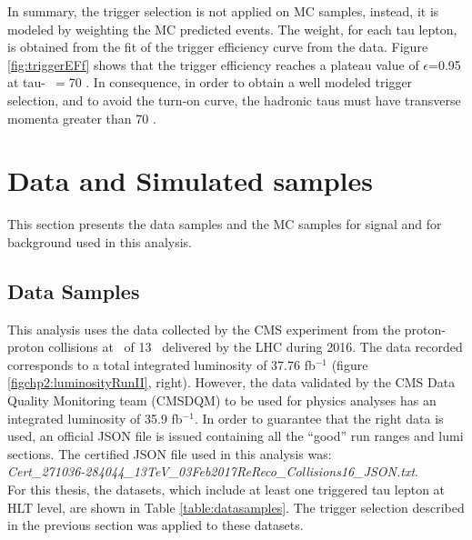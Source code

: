\noindent In summary, the trigger selection is not applied on MC samples, instead, it
is modeled by weighting the MC predicted events. The weight, for each tau lepton, is 
obtained from the fit of the trigger efficiency curve from the 
data. Figure \ref{fig:triggerEFf} shows that the trigger efficiency reaches 
a plateau value of $\epsilon$=0.95 at tau-\pt~$=$70 \GeV. In consequence, in order to obtain
a well modeled trigger selection, and to avoid the turn-on curve, the hadronic taus must have 
transverse momenta greater than 70 \GeV.

\section{Data and Simulated samples}
\label{sec:Samples}

This section presents the data samples and  the MC samples
for signal and for background used in this analysis.

\subsection{Data Samples}
\label{subsec:Data}

This analysis uses the data collected by the CMS experiment
from the proton-proton collisions at 
\centermassenergy~of 13 \TeV~delivered by the LHC during 2016. The data 
recorded corresponds to a total integrated 
luminosity of 37.76 fb$^{-1}$ (figure \ref{figchp2:luminosityRunII}, right). However, 
the data validated by the CMS Data Quality Monitoring team (CMSDQM) to be used 
for physics analyses has an integrated luminosity of 35.9 fb$^{-1}$. In order to guarantee 
that the right data is used, an official JSON file is issued containing all 
the ``good'' run ranges and lumi sections. The certified JSON file 
used in this analysis was:\\

\textit{Cert\_271036-284044\_13TeV\_03Feb2017ReReco\_Collisions16\_JSON.txt}. \\

\noindent For this thesis, the datasets, which include at least one triggered tau lepton at HLT
level, are shown in Table \ref{table:datasamples}. The trigger 
selection described in the previous section was applied to these datasets.

